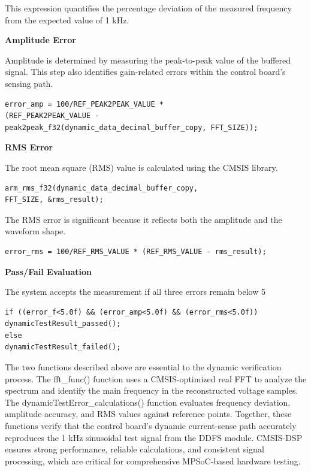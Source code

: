 \begin{enumerate}
	This expression quantifies the percentage deviation of the measured frequency from the expected value of 1 kHz. 
	
	\textbf{Amplitude Error}
	
	Amplitude is determined by measuring the peak-to-peak value of the buffered signal. This step also identifies gain-related errors within the control board’s sensing path.

\begin{lstlisting}
error_amp = 100/REF_PEAK2PEAK_VALUE * 
(REF_PEAK2PEAK_VALUE - 
peak2peak_f32(dynamic_data_decimal_buffer_copy, FFT_SIZE));
\end{lstlisting}

	\textbf{RMS Error}
	
	The root mean square (RMS) value is calculated using the CMSIS library. 
	
\begin{lstlisting}
arm_rms_f32(dynamic_data_decimal_buffer_copy, 
FFT_SIZE, &rms_result);
\end{lstlisting}

	The RMS error is significant because it reflects both the amplitude and the waveform shape.

\begin{lstlisting}
error_rms = 100/REF_RMS_VALUE * (REF_RMS_VALUE - rms_result);
\end{lstlisting}

	\textbf{Pass/Fail Evaluation}

The system accepts the measurement if all three errors remain below 5%

\begin{lstlisting}
if ((error_f<5.0f) && (error_amp<5.0f) && (error_rms<5.0f))
dynamicTestResult_passed();
else
dynamicTestResult_failed();
\end{lstlisting}
\end{enumerate}

The two functions described above are essential to the dynamic verification process. The fft\_func() function uses a CMSIS-optimized real \acs{FFT} to analyze the spectrum and identify the main frequency in the reconstructed voltage samples. The dynamicTestError\_calculations() function evaluates frequency deviation, amplitude accuracy, and RMS values against reference points. Together, these functions verify that the control board’s dynamic current-sense path accurately reproduces the 1 kHz sinusoidal test signal from the \acs{DDFS} module. \acs{CMSIS-DSP} ensures strong performance, reliable calculations, and consistent signal processing, which are critical for comprehensive \acs{MPSoC}-based hardware testing.

